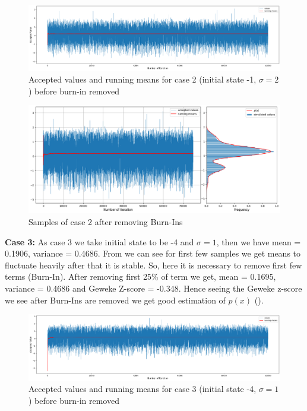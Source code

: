 \begin{example}
	\begin{figure}[H]
		\centering
		\includegraphics[width=1\textwidth]{./images/metropolis/example1/sample-2-values.png}
		\caption{Accepted values and running means for case 2 (initial state -1, $ \sigma = 2 $) before burn-in removed}
	\end{figure}

	\begin{figure}[H]
		\centering
		\includegraphics[width=1\textwidth]{./images/metropolis/example1/sample-2-value-hist-bo.png}
		\caption{Samples of case 2 after removing Burn-Ins}
	\end{figure}

	\textbf{Case 3:} As case 3 we take initial state to be -4 and $ \sigma = 1$, then we have mean = 0.1906, variance = 0.4686. From  we can see for first few samples we get means to fluctuate heavily after that it is stable. So, here it is necessary to remove first few terms (Burn-In). After removing first 25\% of term we get, mean = 0.1695, variance = 0.4686 and Geweke Z-score = -0.348. Hence seeing the Geweke z-score we see after Burn-Ins are removed we get good estimation of $ p(x) $ ().

	\begin{figure}[H]
		\centering
		\includegraphics[width=1\textwidth]{./images/metropolis/example1/sample-3-values.png}
		\caption{Accepted values and running means for case 3 (initial state -4, $ \sigma = 1 $) before burn-in removed}
		\label{fig:MH sample3}
	\end{figure}


\end{example}

